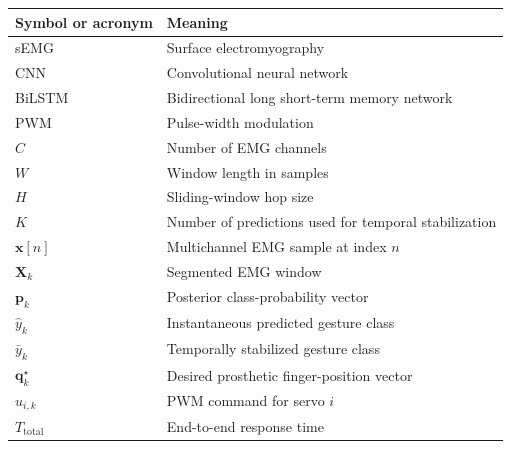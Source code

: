 \documentclass[technologies,article,submit,pdftex,moreauthors]{Definitions/mdpi}
\begin{document}
\begin{tabularx}{0.94\linewidth}{lX}
\toprule
\textbf{Symbol or acronym} & \textbf{Meaning} \\
\midrule
sEMG & Surface electromyography \\
CNN & Convolutional neural network \\
BiLSTM & Bidirectional long short-term memory network \\
PWM & Pulse-width modulation \\
$C$ & Number of EMG channels \\
$W$ & Window length in samples \\
$H$ & Sliding-window hop size \\
$K$ & Number of predictions used for temporal stabilization \\
$\mathbf{x}[n]$ & Multichannel EMG sample at index $n$ \\
$\mathbf{X}_k$ & Segmented EMG window \\
$\mathbf{p}_k$ & Posterior class-probability vector \\
$\hat{y}_k$ & Instantaneous predicted gesture class \\
$\bar{y}_k$ & Temporally stabilized gesture class \\
$\mathbf{q}^{\star}_k$ & Desired prosthetic finger-position vector \\
$u_{i,k}$ & PWM command for servo $i$ \\
$T_{\mathrm{total}}$ & End-to-end response time \\
\bottomrule
\end{tabularx}

\end{document}
